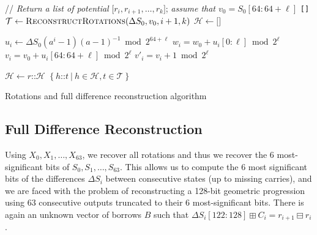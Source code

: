 \documentclass[submission,svgnames,journal=tosc]{iacrtrans}
\begin{document}
\begin{algorithm}
\begin{algorithmic}[1]
 \State // \emph{Return a list of potential} $\texttt{[}r_i, r_{i+1}, \dots, r_k\texttt{]}$; \emph{assume that $v_0 = S_0[64:64+\ell]$}
  \State \Return \texttt{[]} 
  \EndIf
  \State $\mathcal{T} \gets \Call{ReconstructRotations}{\Delta S_0, v_0, i + 1, k}$ 
  \State $\mathcal{H} \gets \texttt{[]}$ 

  \State $u_i \gets \Delta S_0 (a^i-1)(a-1)^{-1} \bmod 2^{64+\ell}$ 
  \State $w_i = w_0 + u_i[0:\ell] \bmod 2^{\ell}$ 
  \State $v_i = v_0 + u_i[64:64+\ell] \bmod 2^{\ell}$ 
  \State $v'_i = v_i + 1 \bmod 2^{\ell}$

   
   
  \State $\mathcal{H} \gets r \texttt{::} \mathcal{H}$ 
  \EndIf
  \EndFor
  \State \Return $\left\{ h\texttt{::} t~|~ h \in \mathcal{H}, t \in \mathcal{T} \right\}$ 
  \EndFunction
\end{algorithmic}
\caption{Rotations and full difference reconstruction algorithm}
\label{algo:unknown_2}
\end{algorithm}


\subsection{Full Difference Reconstruction}
\label{sec:big_cvp}

Using $X_0, X_1, \dots, X_{63}$, we recover all rotations and thus we recover
the 6 most-significant bits of $S_0, S_1, \dots, S_{63}$. This allows us to
compute the 6 most significant bits of the differences $\Delta S_i$ between
consecutive states (up to missing carries), and we are faced with the problem of
reconstructing a 128-bit geometric progression using 63 consecutive outputs
truncated to their 6 most-significant bits. There is again an unknown vector of
borrows $B$ such that $\Delta S_i[122:128] \boxplus C_i= r_{i+1} \boxminus r_i$.
\end{document}
